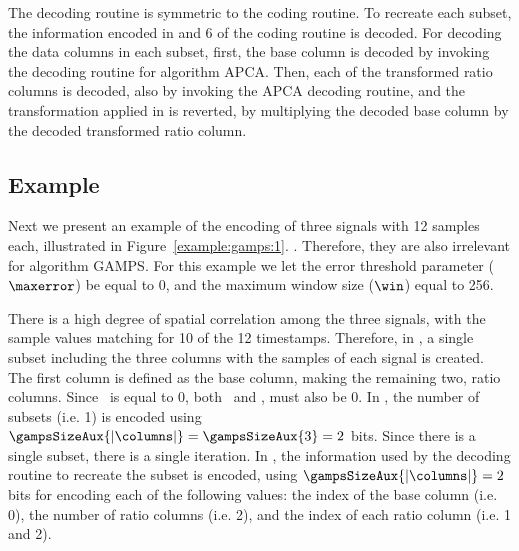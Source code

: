 The decoding routine is symmetric to the coding routine. To recreate each subset, the information encoded in  and 6 of the coding routine is decoded. For decoding the data columns in each subset, first, the base column is decoded by invoking the decoding routine for algorithm APCA. Then, each of the transformed ratio columns is decoded, also by invoking the APCA decoding routine, and the transformation applied in  is reverted, by multiplying the decoded base column by the decoded transformed ratio column.




\clearpage


\subsection{Example}
\label{algo:gamps:example}


Next we present an example of the encoding of three signals with 12 samples each, illustrated in Figure~\ref{example:gamps:1}. . Therefore, they are also irrelevant for algorithm GAMPS. For this example we let the error threshold parameter ($\maxerror$) be equal to 0, and the maximum window size ($\win$) equal to 256.




There is a high degree of spatial correlation among the three signals, with the sample values matching for 10 of the 12 timestamps. Therefore, in , a single subset including the three columns with the samples of each signal is created. The first column is defined as the base column, making the remaining two, ratio columns. Since \maxerror\ is equal to 0, both \epsilonB\ and \epsilonR, must also be 0. In , the number of subsets (i.e. 1) is encoded using $\gampsSizeAux{|\columns|}=\gampsSizeAux{3}=2$ bits. Since there is a single subset, there is a single iteration. In , the information used by the decoding routine to recreate the subset is encoded, using $\gampsSizeAux{|\columns|}=2$ bits for encoding each of the following values: the index of the base column (i.e. 0), the number of ratio columns (i.e. 2), and the index of each ratio column (i.e. 1 and 2). 


